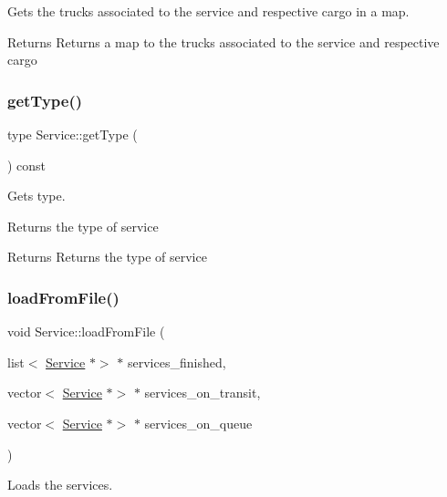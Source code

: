 Gets the trucks associated to the service and respective cargo in a map. 

\begin{DoxyReturn}{Returns}
Returns a map to the trucks associated to the service and respective cargo 
\end{DoxyReturn}
\mbox{\label{class_service_a75f96cd94a42b604ff179343576e1bba}} 
\subsubsection{\texorpdfstring{get\+Type()}{getType()}}
{\footnotesize\ttfamily type Service\+::get\+Type (\begin{DoxyParamCaption}{ }\end{DoxyParamCaption}) const}



Gets type. 

Returns the type of service

\begin{DoxyReturn}{Returns}
Returns the type of service 
\end{DoxyReturn}
\mbox{\label{class_service_add72b2a9e781bdb20a26bdff39952088}} 
\subsubsection{\texorpdfstring{load\+From\+File()}{loadFromFile()}}
{\footnotesize\ttfamily void Service\+::load\+From\+File (\begin{DoxyParamCaption}\item[{list$<$ \hyperlink{class_service}{Service} $\ast$$>$ $\ast$}]{services\+\_\+finished,  }\item[{vector$<$ \hyperlink{class_service}{Service} $\ast$$>$ $\ast$}]{services\+\_\+on\+\_\+transit,  }\item[{vector$<$ \hyperlink{class_service}{Service} $\ast$$>$ $\ast$}]{services\+\_\+on\+\_\+queue }\end{DoxyParamCaption})\hspace{0.3cm}{\ttfamily [static]}}



Loads the services. 


